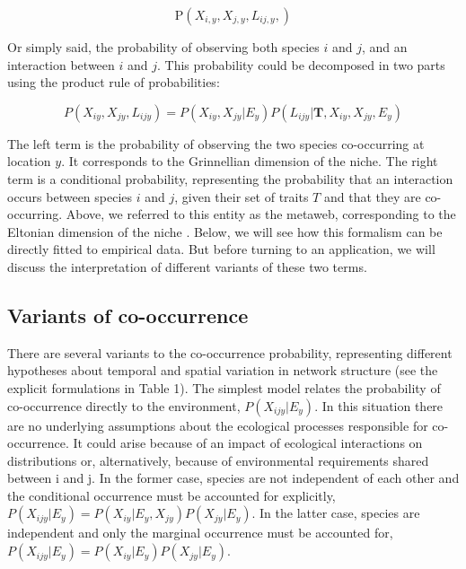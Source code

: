 \documentclass[12pt]{article}
\begin{document}
\begin{equation}
	\text{P}(X_{i,y},X_{j,y},L_{ij,y},)
\end{equation}

Or simply said, the probability of observing both species $i$ and $j$, and an
interaction between $i$ and $j$. This probability could be decomposed in two parts
using the product rule of probabilities:

\begin{equation}
	P(X_{iy},X_{jy},L_{ijy})=P(X_{iy},X_{jy}|E_y)P(L_{ijy}|\mathbf{T},X_{iy},X_{jy},E_y)
\end{equation}

The left term is the probability of observing the two species co-occurring at
location $y$. It corresponds to the Grinnellian dimension of the niche. The
right term is a conditional probability, representing the probability that an
interaction occurs between species $i$ and $j$, given their set of traits $T$ and
that they are co-occurring. Above, we referred to this entity as the metaweb,
corresponding to the Eltonian dimension of the niche . Below, we will see how
this formalism can be directly fitted to empirical data. But before turning to
an application, we will discuss the interpretation of different variants of
these two terms.

\subsection*{Variants of co-occurrence}

There are several variants to the co-occurrence probability, representing
different hypotheses about temporal and spatial variation in network structure
(see the explicit formulations in Table 1). The simplest model relates the
probability of co-occurrence directly to the environment, $P(X_{ijy} |E_y)$. In
this situation there are no underlying assumptions about the ecological
processes responsible for co-occurrence. It could arise because of an impact
of ecological interactions on distributions \citep{Pollock2014} or, alternatively,
because of environmental requirements shared between i and j. In the former
case, species are not independent of each other and the conditional occurrence
must be accounted for explicitly, $P(X_{ijy} |E_y)=P(X_{iy} |E_y,X_{jy})P(X_{jy} |E_y)$.
In the latter case, species are independent and only the marginal occurrence
must be accounted for, $P(X_{ijy} |E_y)=P(X_{iy} |E_y)P(X_{jy} |E_y)$.
\end{document}
